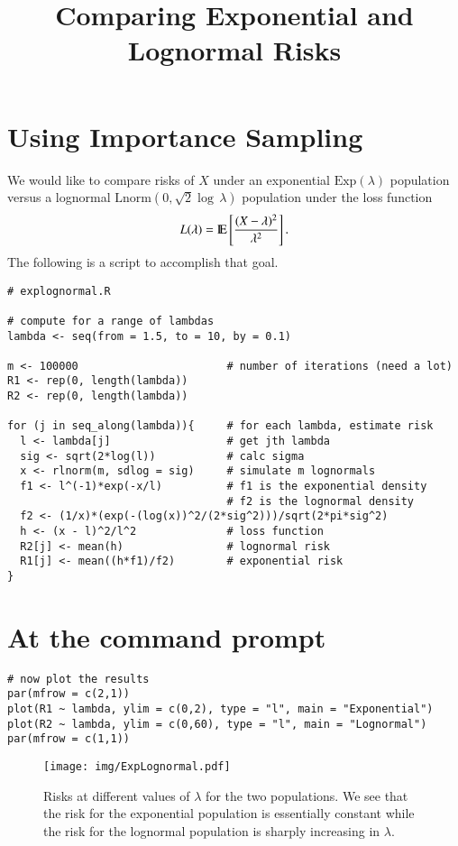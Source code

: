 \documentclass[11pt,english]{article}
\title{Comparing Exponential and Lognormal Risks}
\date{}
\begin{document}
\maketitle


\section*{Using Importance Sampling}
\label{sec-1}


We would like to compare risks of $X$ under an exponential $\mathrm{Exp}(\lambda)$ population versus a lognormal $\mathrm{Lnorm}(0,\sqrt{2}\log\,\lambda)$ population under the loss function
\[
L(\lambda) = \mathrm{I\hspace{-1.5pt}E} \left[\frac{(X - \lambda)^{2}}{\lambda^{2}}\right].
\]
The following is a script to accomplish that goal.

\begin{verbatim}
# explognormal.R

# compute for a range of lambdas
lambda <- seq(from = 1.5, to = 10, by = 0.1)

m <- 100000                       # number of iterations (need a lot)
R1 <- rep(0, length(lambda))
R2 <- rep(0, length(lambda))

for (j in seq_along(lambda)){     # for each lambda, estimate risk
  l <- lambda[j]                  # get jth lambda
  sig <- sqrt(2*log(l))           # calc sigma
  x <- rlnorm(m, sdlog = sig)     # simulate m lognormals
  f1 <- l^(-1)*exp(-x/l)          # f1 is the exponential density
                                  # f2 is the lognormal density
  f2 <- (1/x)*(exp(-(log(x))^2/(2*sig^2)))/sqrt(2*pi*sig^2) 
  h <- (x - l)^2/l^2              # loss function
  R2[j] <- mean(h)                # lognormal risk
  R1[j] <- mean((h*f1)/f2)        # exponential risk
}
\end{verbatim}
\section*{At the command prompt}
\label{sec-2}



\begin{verbatim}
# now plot the results
par(mfrow = c(2,1))
plot(R1 ~ lambda, ylim = c(0,2), type = "l", main = "Exponential")
plot(R2 ~ lambda, ylim = c(0,60), type = "l", main = "Lognormal")
par(mfrow = c(1,1))
\end{verbatim}




\begin{figure}[h!]
\centering
\texttt{[image: img/ExpLognormal.pdf]}
\caption{\label{fig:yplot}Risks at different values of $\lambda$ for the two populations.  We see that the risk for the exponential population is essentially constant while the risk for the lognormal population is sharply increasing in $\lambda$.}
\end{figure}
\end{document}
